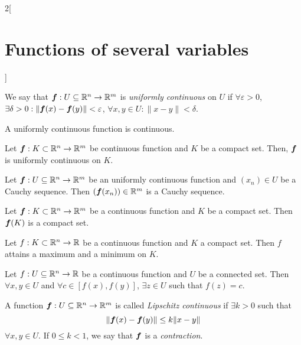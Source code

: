 \documentclass[../../../main.tex]{subfiles}
\begin{document}
\begin{multicols}{2}[\section{Functions of several variables}]
\begin{definition}
  \end{definition}
  \begin{definition}
    We say that $\mathbf{\boldsymbol{f}}:U\subseteq\mathbb{R}^n\rightarrow\mathbb{R}^m$ is \textit{uniformly continuous} on $U$ if $\forall\varepsilon>0$, $\exists\delta>0:\|\mathbf{\boldsymbol{f}}(x)-\mathbf{\boldsymbol{f}}(y)\|<\varepsilon$, $\forall x,y\in U:\|x-y\|<\delta$.
  \end{definition}
  \begin{corollary}
    A uniformly continuous function is continuous.
  \end{corollary}
  \begin{theorem}
    Let $\mathbf{\boldsymbol{f}}:K\subset\mathbb{R}^n\rightarrow\mathbb{R}^m$ be continuous function and $K$ be a compact set. Then, $\mathbf{\boldsymbol{f}}$ is uniformly continuous on $K$.
  \end{theorem}
  \begin{theorem}
    Let $\mathbf{\boldsymbol{f}}:U\subseteq\mathbb{R}^n\rightarrow\mathbb{R}^m$ be an uniformly continuous function and $(x_n)\in U$ be a Cauchy sequence. Then $(\mathbf{\boldsymbol{f}}(x_n))\in\mathbb{R}^m$ is a Cauchy sequence.
  \end{theorem}
  \begin{theorem}
    Let $\mathbf{\boldsymbol{f}}:K\subset\mathbb{R}^n\rightarrow\mathbb{R}^m$ be a continuous function and $K$ be a compact set. Then $\mathbf{\boldsymbol{f}}(K)$ is a compact set.
  \end{theorem}
  \begin{theorem}
    Let $f:K\subset\mathbb{R}^n\rightarrow\mathbb{R} $ be a continuous function and $K$ a compact set. Then $f$ attains a maximum and a minimum on $K$.
  \end{theorem}
  \begin{theorem}
    Let $f:U\subseteq\mathbb{R}^n\rightarrow\mathbb{R} $ be a continuous function and $U$ be a connected set. Then $\forall x,y\in U$ and $\forall c\in[f(x),f(y)]$, $\exists z\in U$ such that $f(z)=c$.
  \end{theorem}
  \begin{definition}
    A function $\mathbf{\boldsymbol{f}}:U\subseteq\mathbb{R}^n\rightarrow\mathbb{R}^m$ is called \textit{Lipschitz continuous} if $\exists k>0$ such that $$\|\mathbf{\boldsymbol{f}}(x)-\mathbf{\boldsymbol{f}}(y)\|\leq k\|x-y\|$$ $\forall x,y\in U$. If $0\leq k<1$, we say that $\mathbf{\boldsymbol{f}}$ is a \textit{contraction}.
    \label{FOSV_contr}
  \end{definition}

\end{multicols}
\end{document}
